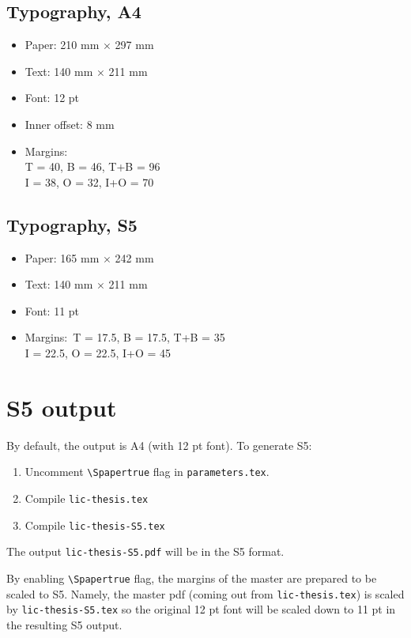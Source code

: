 \subsection*{Typography, \textbf{A4}}

\begin{itemize}
\item Paper: 210 mm $\times$ 297 mm
\item Text: 140 mm $\times$ 211 mm
\item Font: 12 pt
\item Inner offset: 8 mm
\item Margins:\\
T = 40, B = 46, T+B = 96\\
I = 38, O = 32, I+O = 70
\end{itemize}

\subsection*{Typography, \textbf{S5}}

\begin{itemize}
\item Paper: 165 mm $\times$ 242 mm
\item Text: 140 mm $\times$ 211 mm
\item Font: 11 pt
\item Margins:\
T = 17.5, B = 17.5, T+B = 35\\
I = 22.5, O = 22.5, I+O = 45
\end{itemize}

\clearpage

\section*{S5 output}

By default, the output is A4 (with 12 pt font). 
To generate S5:

\begin{enumerate}
  \item Uncomment \texttt{\textbackslash{}Spapertrue} flag in 
    \texttt{parameters.tex}.
  \item Compile \texttt{lic-thesis.tex}
  \item Compile \texttt{lic-thesis-S5.tex}
\end{enumerate}

The output \texttt{lic-thesis-S5.pdf} will be in the S5 format.

By enabling \texttt{\textbackslash{}Spapertrue} flag, 
the margins of the master are prepared to be scaled to S5. 
Namely, the master pdf (coming out from \texttt{lic-thesis.tex}) 
is scaled by \texttt{lic-thesis-S5.tex} so the original 
12 pt font will be scaled down to 11 pt in the resulting S5 output.

